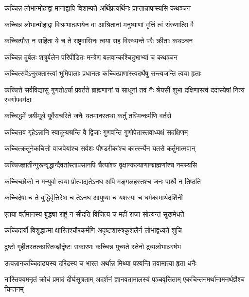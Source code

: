 \twolineshloka
{कच्चिन्न लोभान्मोहाद्वा मानाद्वापि विशाम्पते}
{अर्थिप्रत्यर्थिनः प्राप्तान्नापास्यसि कथञ्चन}


\twolineshloka
{कच्चिन्न लोभान्मोहाद्वा विश्रम्भात्प्रणयेन वा}
{आश्रितानां मनुष्याणां वृत्तिं त्वं संरुणात्सि वै}


\twolineshloka
{कच्चित्पौरा न सहिता ये च ते राष्ट्रवासिनः}
{त्वया सह विरुध्यन्ते परैः क्रीताः कथञ्चन}


\twolineshloka
{कच्चिन्न दुर्बलः शत्रुर्बलेन परिपीडितः}
{मन्त्रेण बलवान्कश्चिदुभाभ्यां च कथञ्चन}


\twolineshloka
{कच्चित्सर्वेऽनुरक्तास्त्वां भूमिपालाः प्रधानतः}
{कच्चित्प्राणांस्त्वदर्थेषु सन्त्यजन्ति त्वया हृताः}


\threelineshloka
{कच्चित्ते सर्वविद्यासु गुणतोऽर्चा प्रवर्तते}
{ब्राह्मणानां च साधूनां तव नैः श्रेयसी शुभा}
{दक्षिणास्त्वं ददास्येषां नित्यं स्वर्गापवर्गदाः}


\twolineshloka
{कच्चिद्धर्मे त्रयीमूले पूर्वैराचरिते जनैः}
{यतमानस्तथा कर्तुं तस्मिन्कर्मणि वर्तसे}


\twolineshloka
{कच्चित्तव गृहेऽन्नानि स्वादून्यश्रन्ति वै द्विजाः}
{गुणवन्ति गुणोपेतास्तवाध्यक्षं सदक्षिणम्}


\twolineshloka
{कच्चित्क्रतूनेकचित्तो वाजपेयांश्च सर्वशः}
{पौण्डरीकांश्च कार्त्स्न्येन यतसे कर्तुमात्मवान्}


\twolineshloka
{कच्चिज्ज्ञातीन्गुरून्वृद्धान्दैवतांस्तापसानपि}
{चैत्यांश्च वृक्षान्कल्याणान्ब्राह्मणांश्च नमस्यसि}


\twolineshloka
{कच्चिच्छोको न मन्युर्वा त्वया प्रोत्पाद्यतेऽनघ}
{अपि मङ्गलहस्तश्च जनः पार्श्वे न तिष्ठति}


\twolineshloka
{कच्चिदेषा च ते बुद्धिर्वृत्तिरेषा च तेऽनघ}
{आयुष्या च यशस्या च धर्मकामार्थदर्शिनी}


\twolineshloka
{एतया वर्तमानस्य बुद्ध्या राष्ट्रं न सीदति}
{विजित्य च महीं राजा सोत्यन्तं सुखमेधते}


\twolineshloka
{कच्चिदार्यो विशुद्धात्मा क्षारितश्चौरकर्मणि}
{अदृष्टशास्त्रकुशलैर्न लोभाद्वध्यते शुचि}


\twolineshloka
{दुष्टो गृहीतस्तत्कारितज्ज्ञैर्दृष्टः सकारणः}
{कच्चिन्न मुच्यते स्तेनो द्रव्यलोभान्नरर्षभ}


\twolineshloka
{उत्पन्नानकच्चिदाढ्यस्य दरिद्रस्य च भारत}
{अर्थान्न मिथ्या पश्यन्ति तवामात्या हृता धनैः}


\threelineshloka
{नास्तिक्यमनृतं क्रोधं प्रमादं दीर्घसूत्रताम्}
{अदर्शनं ज्ञानवतामालस्यं पञ्चवृत्तिताम्}
{एकचिन्तनमर्थानामनर्थज्ञैश्च चिन्तनम्}


